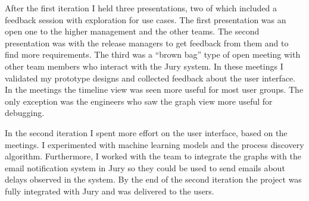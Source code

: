 After the first iteration I held three presentations, two of which included a feedback session with exploration for use cases. The first presentation was an open one to the higher management and the other teams. The second presentation was with the release managers to get feedback from them and to find more requirements. The third was a ``brown bag'' type of open meeting with other team members who interact with the Jury system.
In these meetings I validated my prototype designs and collected feedback about the user interface.
In the meetings the timeline view was seen more useful for most user groups.
The only exception was the engineers who saw the graph view more useful for debugging.

In the second iteration I spent more effort on the user interface, based on the meetings.
I experimented with machine learning models and the process discovery algorithm.
Furthermore, I worked with the team to integrate the graphs with the email notification system in Jury so they could be used to send emails about delays observed in the system. 
By the end of the second iteration the project was fully integrated with Jury and was delivered to the users.